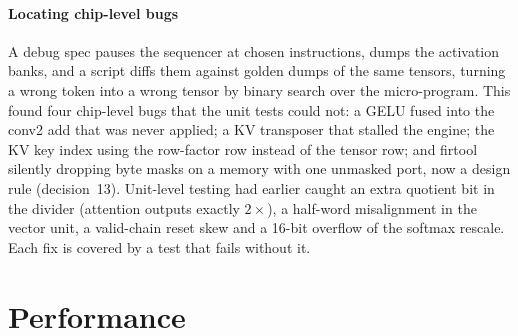\documentclass[conference]{IEEEtran}
\begin{document}
\begin{table}[t]
\caption{End-to-end runs on Verilator, 3000 frames each.}
\label{tab:e2e}
\centering\small
{}
\end{table}

\paragraph{Locating chip-level bugs} A debug spec pauses the sequencer at chosen instructions, dumps the activation banks, and a script diffs them against golden dumps of the same tensors, turning a wrong token into a wrong tensor by binary search over the micro-program. This found four chip-level bugs that the unit tests could not: a GELU fused into the conv2 add that was never applied; a KV transposer that stalled the engine; the KV key index using the row-factor row instead of the tensor row; and firtool silently dropping byte masks on a memory with one unmasked port, now a design rule (decision~13). Unit-level testing had earlier caught an extra quotient bit in the divider (attention outputs exactly $2\times$), a half-word misalignment in the vector unit, a valid-chain reset skew and a 16-bit overflow of the softmax rescale. Each fix is covered by a test that fails without it.

\section{Performance}\label{sec:perf}
\end{document}
